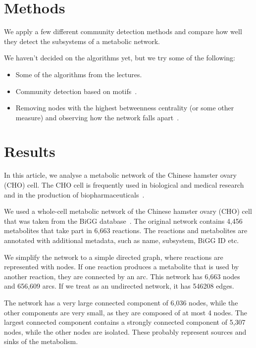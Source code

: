 \section{Methods}
\label{sec:methods}

We apply a few different community detection methods and compare how well
they detect the subsystems of a metabolic network.

We haven't decided on the algorithms yet, but we try some of the following:

\begin{itemize}
\item
  Some of the algorithms from the lectures.
\item
  Community detection based on motifs~\cite{benson2016higher}.
\item
  Removing nodes with the highest betweenness centrality (or some other measure)
  and observing how the network falls apart~\cite{holme2003subnetwork}.
\end{itemize}

\section{Results}
\label{sec:results}

In this article, we analyse a metabolic network of the Chinese hamster
ovary (CHO) cell. The CHO cell is frequently used in biological and medical
research and in the production of biopharmaceuticals~\cite{chocons}.

We used a whole-cell metabolic network of the Chinese hamster ovary (CHO)
cell that was taken from the BiGG database~\cite{bigg,chocons}. The original
network contains 4,456 metabolites that take part in 6,663 reactions. The
reactions and metabolites are annotated with additional metadata, such as name,
subsystem, BiGG ID etc.

We simplify the network to a simple directed graph, where reactions are
represented with nodes. If one reaction produces a metabolite that is used by
another reaction, they are connected by an arc. This network has 6,663 nodes and
656,609 arcs. If we treat as an undirected network, it has 546208 edges.

The network has a very large connected component of 6,036 nodes, while the other
components are very small, as they are composed of at most 4 nodes. The largest
connected component contains a strongly connected component of 5,307 nodes,
while the other nodes are isolated. These probably represent sources and sinks
of the metabolism.


